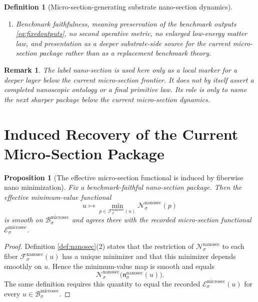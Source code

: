 \documentclass[11pt]{article}
\newcommand{\MicroSectionBody}[1]{\mathcal B_{#1}^{\mathrm{microsec}}}
\newcommand{\MicroSectionFunctional}[1]{\mathscr E_{#1}^{\mathrm{microsec}}}
\newcommand{\MicroSectionShell}[1]{\mathcal Z_{#1}^{\mathrm{microsec}}}
\newcommand{\NanoSectionProj}[1]{\Pi_{#1}^{\mathrm{nanosec}}}
\newcommand{\NanoSectionFiber}[2]{\mathcal F_{#1}^{\mathrm{nanosec}}(#2)}
\newcommand{\NanoSectionMicroMin}[1]{\mathfrak n_{#1}^{\mathrm{nanosec}}}
\newcommand{\NanoSectionFunctional}[1]{\mathscr N_{#1}^{\mathrm{nanosec}}}
\newcommand{\NanoSectionShell}[1]{\mathcal Z_{#1}^{\mathrm{nanosec}}}
\newtheorem{definition}{Definition}
\newtheorem{proposition}{Proposition}
\newtheorem{remark}{Remark}
\begin{document}
\begin{definition}[Micro-section-generating substrate nano-section dynamics]
\begin{enumerate}
\[\begin{array}{l}
    \NanoSectionFunctional{\sigma}(p)
    =
    \displaystyle\min_{q\in\NanoSectionFiber{\sigma}{\NanoSectionProj{\sigma}(p)}}
    \NanoSectionFunctional{\sigma}(q)
    \end{array}
    \right\},
    \]
    and
    \[
    \NanoSectionProj{\sigma}\big|_{\NanoSectionShell{\sigma}}
    :
    \NanoSectionShell{\sigma}
    \xrightarrow{\cong}
    \MicroSectionShell{\sigma}
    \]
    is a diffeomorphism.
    \item Benchmark faithfulness, meaning preservation of the benchmark outputs \eqref{eq:fixedoutputs}, no second operative metric, no enlarged low-energy matter law, and presentation as a deeper substrate-side source for the current micro-section package rather than as a replacement benchmark theory.
\end{enumerate}
\end{definition}

\begin{remark}
The label \emph{nano-section} is used here only as a local marker for a deeper layer below the current micro-section frontier. It does not by itself assert a completed nanoscopic ontology or a final primitive law. Its role is only to name the next sharper package below the current micro-section dynamics.
\end{remark}

\section{Induced Recovery of the Current Micro-Section Package}

\begin{proposition}[The effective micro-section functional is induced by fiberwise nano minimization]
\label{prop:functional}
Fix a benchmark-faithful nano-section package. Then the effective minimum-value functional
\[
u\longmapsto
\min_{p\in\NanoSectionFiber{\sigma}{u}}
\NanoSectionFunctional{\sigma}(p)
\]
is smooth on \(\MicroSectionBody{\sigma}\) and agrees there with the recorded micro-section functional \(\MicroSectionFunctional{\sigma}\).
\end{proposition}

\begin{proof}
Definition \ref{def:nanosec}(2) states that the restriction of \(\NanoSectionFunctional{\sigma}\) to each fiber \(\NanoSectionFiber{\sigma}{u}\) has a unique minimizer and that this minimizer depends smoothly on \(u\). Hence the minimum-value map is smooth and equals
\[
\NanoSectionFunctional{\sigma}\bigl(\NanoSectionMicroMin{\sigma}(u)\bigr).
\]
The same definition requires this quantity to equal the recorded \(\MicroSectionFunctional{\sigma}(u)\) for every \(u\in\MicroSectionBody{\sigma}\).
\end{proof}
\end{document}
